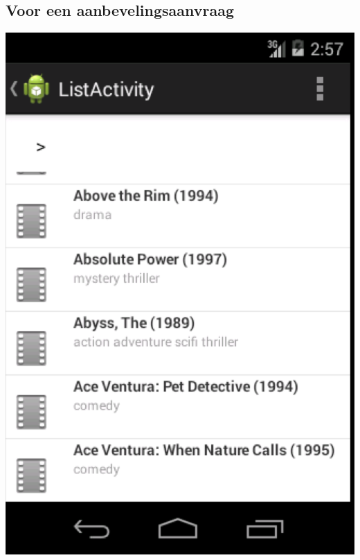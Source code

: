 \subsection{Voor een aanbevelingsaanvraag}
\label{voor_aanvraag}

\begin{center}
\centering
\includegraphics[scale=0.5]{fig/all_items} 
\label{all_items}
 
\end{center}

